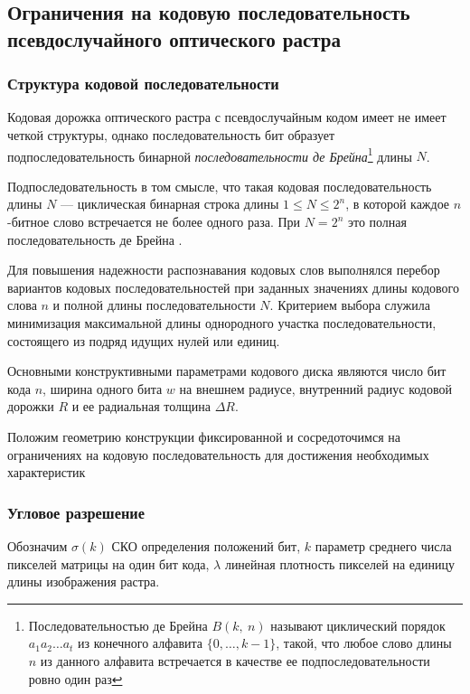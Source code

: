 \subsection{Ограничения на кодовую последовательность псевдослучайного оптического растра}
\label{sec:pseudorand_code_constraints}

\subsubsection{Структура кодовой последовательности}\label{subsubsec:code_structure}

Кодовая дорожка оптического растра с псевдослучайным кодом имеет не имеет четкой структуры, однако последовательность бит образует подпоследовательность бинарной \textit{последовательности де Брейна}\footnote{Последовательностью де Брейна $B(k,~n)$ называют циклический порядок $a_1a_2\ldots a_t$ из конечного алфавита $\{0,\ldots, k-1\}$, такой, что любое слово длины $n$ из данного алфавита встречается в качестве ее подпоследовательности ровно один раз} длины $N$. 

Подпоследовательность в том смысле, что такая кодовая последовательность длины $N$ --- циклическая бинарная строка длины $1 \leq N \leq 2^n$, в которой каждое $n$-битное слово встречается не более одного раза. При $N = 2^n$ это полная последовательность де Брейна \cite{debruijn_cutdown}.

Для повышения надежности распознавания кодовых слов выполнялся перебор вариантов кодовых последовательностей при заданных значениях длины кодового слова $n$ и полной длины последовательности $N$. Критерием выбора служила минимизация максимальной длины однородного участка последовательности, состоящего из подряд идущих нулей или единиц.

Основными конструктивными параметрами кодового диска являются число бит кода $n$, ширина одного бита $w$ на внешнем радиусе, внутренний радиус кодовой дорожки $R$ и ее радиальная толщина $\Delta R$.

Положим геометрию конструкции фиксированной и сосредоточимся на ограничениях на кодовую последовательность для достижения необходимых характеристик

\subsubsection{Угловое разрешение}\label{req:angle_resolution}

Обозначим $\sigma(k)$ СКО определения положений бит, $k$ параметр среднего числа пикселей матрицы на один бит кода, $\lambda$ линейная плотность пикселей на единицу длины изображения растра.

